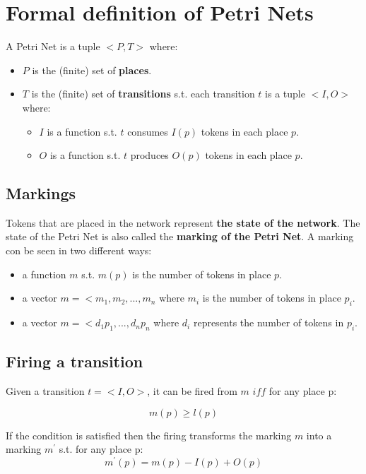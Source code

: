 \section{Formal definition of Petri Nets}
A Petri Net is a tuple $<P, T>$ where:
\begin{itemize}
    \item $P$ is the (finite) set of \textbf{places}.
    \item $T$ is the (finite) set of \textbf{transitions} s.t. each transition $t$ is a tuple $<I, O>$ where:
        \begin{itemize}
            \item $I$ is a function s.t. $t$ consumes $I(p)$ tokens in each place $p$.
            \item $O$ is a function s.t. $t$ produces $O(p)$ tokens in each place $p$.
        \end{itemize}
\end{itemize}

\subsection{Markings}
Tokens that are placed in the network represent\textbf{ the state of the network}. The state of the Petri Net is also called the \textbf{marking of the Petri Net}. A marking con be seen in two different ways:

\begin{itemize}
    \item a function $m$ s.t. $m(p)$ is the number of tokens in place $p$.
    \item a vector $m = <m_{1}, m_{2}, ..., m_{n}$ where $m_{i}$ is the number of tokens in place $p_{i}$. 
    \item a vector $m = <d_{1}p_{1}, ..., d_{n}p_{n}$ where $d_{i}$ represents the number of tokens in $p_{i}$.
\end{itemize}

\subsection{Firing a transition}
Given a transition $t = <I, O>$, it can be fired from $m$ $iff$ for any place p:

\begin{equation*}
    m(p) \geq l(p)
\end{equation*}

If the condition is satisfied then the firing transforms the marking $m$ into a marking $m^{'}$ s.t. for any place p:
\begin{equation*}
    m^{'}(p) = m(p) - I(p) + O(p)
\end{equation*}

